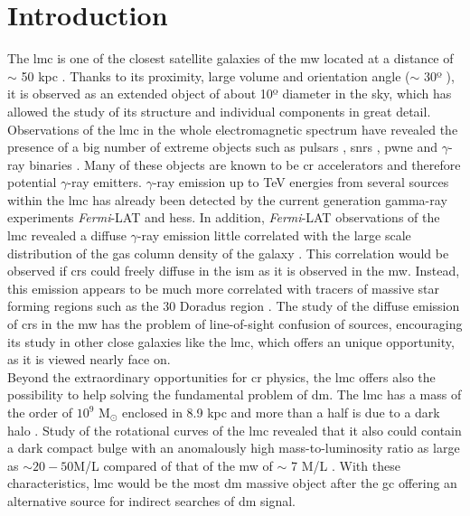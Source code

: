 \documentclass[main.tex]{subfiles}
\begin{document}
\glsresetall
\section{Introduction}

The \gls{lmc} is one of the closest satellite galaxies of the \gls{mw} located at a distance of $\sim$ 50 kpc \cite{2013LMCdistance1}. Thanks to its proximity, large volume and orientation angle ($\sim$ 30º \cite{2004StructureandOrientationLMC}), it is observed as an extended object of about 10º diameter in the sky, which has allowed the study of its structure and individual components in great detail. Observations of the \gls{lmc} in the whole electromagnetic spectrum have revealed the presence of a big number of extreme objects such as pulsars \cite{2013RadioPulsarsLMC} \cite{2016LMCFermiLAT}, \glspl{snr} \cite{2015MultiwavelengthLMCsnr} \cite{2012XMM1987} \cite{2016SNRinXrayLMC},  \gls{pwne} \cite{2015HESSTeVLMC} \cite{2016LMCFermiLAT} \cite{2003PWNeintheLMC} \cite{2008PWNeXrayLMC} and $\gamma$-ray binaries \cite{2017HESSLMCP3}. Many of these objects are known to be \gls{cr} accelerators and therefore potential $\gamma$-ray emitters. $\gamma$-ray emission up to TeV energies from several sources within the \gls{lmc} has already been detected by the current generation gamma-ray experiments \textit{Fermi}-LAT and \gls{hess}. In addition, \textit{Fermi}-LAT observations of the \gls{lmc} revealed a diffuse $\gamma$-ray emission little correlated with the large scale distribution of the gas column density of the galaxy \cite{2010FermiLATLMC11months}. This correlation would be observed if \glspl{cr} could freely diffuse in the \gls{ism} as it is observed in the \gls{mw}. Instead, this emission appears to be much more correlated with tracers of massive star forming regions such as the 30 Doradus region \cite{2012CRinLMC30Doradus}. The study of the diffuse emission of \glspl{cr} in the \gls{mw} has the problem of line-of-sight confusion of sources, encouraging its study in other close galaxies like the \gls{lmc}, which offers an unique opportunity, as it is viewed nearly face on.\\
Beyond the extraordinary opportunities for \gls{cr} physics, the \gls{lmc} offers also the possibility to help solving the fundamental problem of \gls{dm}. The \gls{lmc} has a mass of the order of $10^9$ M$_{\odot}$ enclosed in 8.9 kpc and more than a half is due to a dark halo \cite{2002LMCkinematics}. Study of the rotational curves of the \gls{lmc} revealed that it also could contain a dark compact bulge with an anomalously high mass-to-luminosity ratio as large as $\sim 20-50$M/L \cite{1999LMCbulge} compared of that of the \gls{mw} of $\sim$ 7 M/L \cite{2013MWbulge}. With these characteristics, \gls{lmc} would be the most \gls{dm} massive object after the \gls{gc} offering an alternative source for indirect searches of \gls{dm} signal.\\
\end{document}
